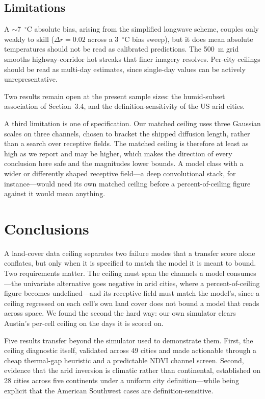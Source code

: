 \documentclass[remotesensing,article,submit,oneauthor]{Definitions/mdpi}
\begin{document}
\subsection{Limitations}

A $\sim$7~$^{\circ}$C absolute bias, arising from the simplified longwave
scheme, couples only weakly to skill ($\Delta r = 0.02$ across a
3~$^{\circ}$C bias sweep), but it does mean absolute temperatures should
not be read as calibrated predictions. The 500~m grid smooths
highway-corridor hot streaks that finer imagery resolves. Per-city
ceilings should be read as multi-day estimates, since single-day values
can be actively unrepresentative.

Two results remain open at the present sample sizes: the humid-subset
association of Section~3.4, and the definition-sensitivity of the US arid
cities.

A third limitation is one of specification. Our matched ceiling uses
three Gaussian scales on three channels, chosen to bracket the shipped
diffusion length, rather than a search over receptive fields. The matched
ceiling is therefore at least as high as we report and may be higher,
which makes the direction of every conclusion here safe and the
magnitudes lower bounds. A model class with a wider or differently shaped
receptive field---a deep convolutional stack, for instance---would need
its own matched ceiling before a percent-of-ceiling figure against it
would mean anything.

\section{Conclusions}

A land-cover data ceiling separates two failure modes that a transfer
score alone conflates, but only when it is specified to match the model it
is meant to bound. Two requirements matter. The ceiling must span the
channels a model consumes---the univariate alternative goes negative in
arid cities, where a percent-of-ceiling figure becomes undefined---and its
receptive field must match the model's, since a ceiling regressed on each
cell's own land cover does not bound a model that reads across space. We
found the second the hard way: our own simulator clears Austin's per-cell
ceiling on the days it is scored on.

Five results transfer beyond the simulator used to demonstrate them.
First, the ceiling diagnostic itself, validated across 49 cities and made
actionable through a cheap thermal-gap heuristic and a predictable NDVI
channel screen. Second, evidence that the arid inversion is climatic
rather than continental, established on 28 cities across five continents
under a uniform city definition---while being explicit that the American
Southwest cases are definition-sensitive.
\end{document}
